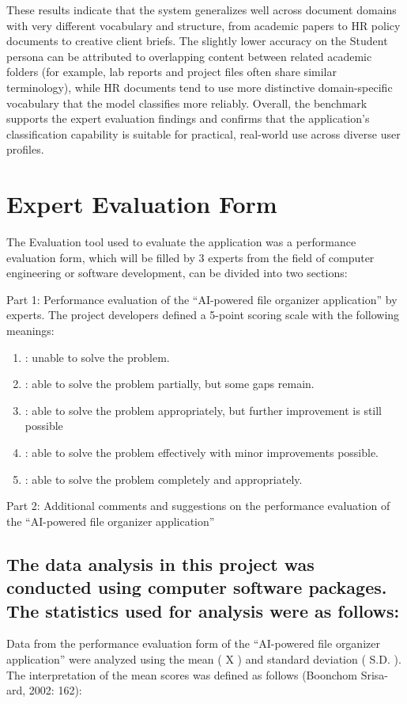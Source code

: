 \documentclass[12pt,oneside,openright,a4paper]{cpe-english-project}
\begin{document}
These results indicate that the system generalizes well across document domains with very different vocabulary and structure, from academic papers to HR policy documents to creative client briefs. The slightly lower accuracy on the Student persona can be attributed to overlapping content between related academic folders (for example, lab reports and project files often share similar terminology), while HR documents tend to use more distinctive domain-specific vocabulary that the model classifies more reliably. Overall, the benchmark supports the expert evaluation findings and confirms that the application's classification capability is suitable for practical, real-world use across diverse user profiles.

\section{Expert Evaluation Form}

The Evaluation tool used to evaluate the application was a performance evaluation form, which will be filled by 3 experts from the field of computer engineering or software development, can be divided into two sections:

\vspace{0.5em}

Part 1: Performance evaluation of the ``AI-powered file organizer application'' by experts. The project developers defined a 5-point scoring scale with the following meanings:

\begin{enumerate}[label=\arabic*.,leftmargin=0.6in]
\item : unable to solve the problem.
\item : able to solve the problem partially, but some gaps remain.
\item : able to solve the problem appropriately, but further improvement is still possible
\item : able to solve the problem effectively with minor improvements possible.
\item : able to solve the problem completely and appropriately.
\end{enumerate}
Part 2: Additional comments and suggestions on the performance evaluation of the ``AI-powered file organizer application''

\subsection*{The data analysis in this project was conducted using computer software packages. The statistics used for analysis were as follows:}
Data from the performance evaluation form of the ``AI-powered file organizer application'' were analyzed using the mean ( X ) and standard deviation ( S.D. ). The interpretation of the mean scores was defined as follows (Boonchom Srisa-ard, 2002: 162):
\end{document}
